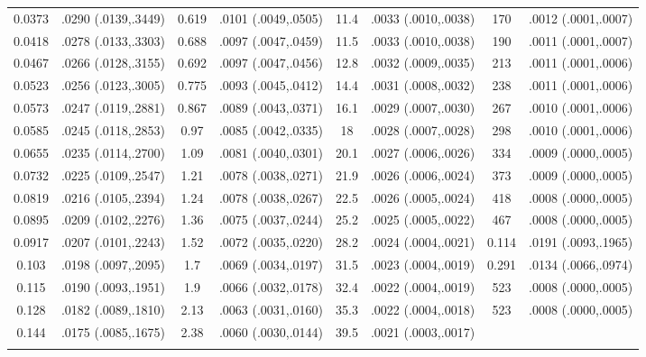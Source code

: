 \begin{longtable}{cccccccc}
  0.0373 & .0290 (.0139,.3449) & 0.619 & .0101 (.0049,.0505) & 11.4 & .0033 (.0010,.0038) & 170 & .0012 (.0001,.0007) \\ 
  0.0418 & .0278 (.0133,.3303) & 0.688 & .0097 (.0047,.0459) & 11.5 & .0033 (.0010,.0038) & 190 & .0011 (.0001,.0007) \\ 
  0.0467 & .0266 (.0128,.3155) & 0.692 & .0097 (.0047,.0456) & 12.8 & .0032 (.0009,.0035) & 213 & .0011 (.0001,.0006) \\ 
  0.0523 & .0256 (.0123,.3005) & 0.775 & .0093 (.0045,.0412) & 14.4 & .0031 (.0008,.0032) & 238 & .0011 (.0001,.0006) \\ 
  0.0573 & .0247 (.0119,.2881) & 0.867 & .0089 (.0043,.0371) & 16.1 & .0029 (.0007,.0030) & 267 & .0010 (.0001,.0006) \\ 
  0.0585 & .0245 (.0118,.2853) & 0.97 & .0085 (.0042,.0335) & 18 & .0028 (.0007,.0028) & 298 & .0010 (.0001,.0006) \\ 
  0.0655 & .0235 (.0114,.2700) & 1.09 & .0081 (.0040,.0301) & 20.1 & .0027 (.0006,.0026) & 334 & .0009 (.0000,.0005) \\ 
  0.0732 & .0225 (.0109,.2547) & 1.21 & .0078 (.0038,.0271) & 21.9 & .0026 (.0006,.0024) & 373 & .0009 (.0000,.0005) \\ 
  0.0819 & .0216 (.0105,.2394) & 1.24 & .0078 (.0038,.0267) & 22.5 & .0026 (.0005,.0024) & 418 & .0008 (.0000,.0005) \\ 
  0.0895 & .0209 (.0102,.2276) & 1.36 & .0075 (.0037,.0244) & 25.2 & .0025 (.0005,.0022) & 467 & .0008 (.0000,.0005) \\ 
  0.0917 & .0207 (.0101,.2243) & 1.52 & .0072 (.0035,.0220) & 28.2 & .0024 (.0004,.0021) & 0.114 & .0191 (.0093,.1965) \\ 
  0.103 & .0198 (.0097,.2095) & 1.7 & .0069 (.0034,.0197) & 31.5 & .0023 (.0004,.0019) & 0.291 & .0134 (.0066,.0974) \\ 
  0.115 & .0190 (.0093,.1951) & 1.9 & .0066 (.0032,.0178) & 32.4 & .0022 (.0004,.0019) & 523 & .0008 (.0000,.0005) \\ 
  0.128 & .0182 (.0089,.1810) & 2.13 & .0063 (.0031,.0160) & 35.3 & .0022 (.0004,.0018) & 523 & .0008 (.0000,.0005) \\ 
  0.144 & .0175 (.0085,.1675) & 2.38 & .0060 (.0030,.0144) & 39.5 & .0021 (.0003,.0017) &  &  \\ 
   \hline
\hline
\label{tab marginalized_risks_eq 1}
\end{longtable}
